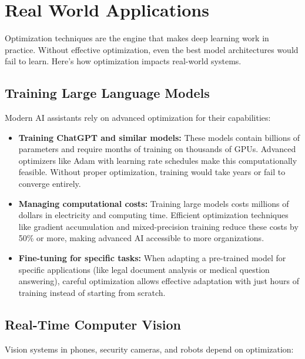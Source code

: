 
\section{Real World Applications}
\label{sec:optimization-real-world}


Optimization techniques are the engine that makes deep learning work in practice. Without effective optimization, even the best model architectures would fail to learn. Here's how optimization impacts real-world systems.

\subsection{Training Large Language Models}

Modern AI assistants rely on advanced optimization for their capabilities:

\begin{itemize}
    \item \textbf{Training ChatGPT and similar models:} These models contain billions of parameters and require months of training on thousands of GPUs. Advanced optimizers like Adam with learning rate schedules make this computationally feasible. Without proper optimization, training would take years or fail to converge entirely.
    
    \item \textbf{Managing computational costs:} Training large models costs millions of dollars in electricity and computing time. Efficient optimization techniques like gradient accumulation and mixed-precision training reduce these costs by 50\% or more, making advanced AI accessible to more organizations.
    
    \item \textbf{Fine-tuning for specific tasks:} When adapting a pre-trained model for specific applications (like legal document analysis or medical question answering), careful optimization allows effective adaptation with just hours of training instead of starting from scratch.
\end{itemize}

\subsection{Real-Time Computer Vision}

Vision systems in phones, security cameras, and robots depend on optimization:

